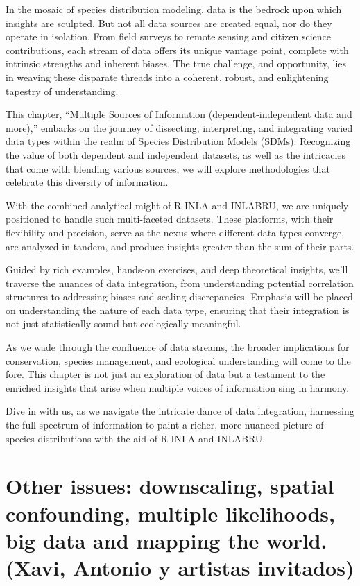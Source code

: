 \documentclass[
]{krantz}
\begin{document}
In the mosaic of species distribution modeling, data is the bedrock upon which insights are sculpted. But not all data sources are created equal, nor do they operate in isolation. From field surveys to remote sensing and citizen science contributions, each stream of data offers its unique vantage point, complete with intrinsic strengths and inherent biases. The true challenge, and opportunity, lies in weaving these disparate threads into a coherent, robust, and enlightening tapestry of understanding.

This chapter, ``Multiple Sources of Information (dependent-independent data and more),'' embarks on the journey of dissecting, interpreting, and integrating varied data types within the realm of Species Distribution Models (SDMs). Recognizing the value of both dependent and independent datasets, as well as the intricacies that come with blending various sources, we will explore methodologies that celebrate this diversity of information.

With the combined analytical might of R-INLA and INLABRU, we are uniquely positioned to handle such multi-faceted datasets. These platforms, with their flexibility and precision, serve as the nexus where different data types converge, are analyzed in tandem, and produce insights greater than the sum of their parts.

Guided by rich examples, hands-on exercises, and deep theoretical insights, we'll traverse the nuances of data integration, from understanding potential correlation structures to addressing biases and scaling discrepancies. Emphasis will be placed on understanding the nature of each data type, ensuring that their integration is not just statistically sound but ecologically meaningful.

As we wade through the confluence of data streams, the broader implications for conservation, species management, and ecological understanding will come to the fore. This chapter is not just an exploration of data but a testament to the enriched insights that arise when multiple voices of information sing in harmony.

Dive in with us, as we navigate the intricate dance of data integration, harnessing the full spectrum of information to paint a richer, more nuanced picture of species distributions with the aid of R-INLA and INLABRU.

\pagebreak
\setcounter{chapter}{14}
\setcounter{section}{0}
\renewcommand{\thepage}{\arabic{page}}

\hypertarget{other-issues-downscaling-spatial-confounding-multiple-likelihoods-big-data-and-mapping-the-world.-xavi-antonio-y-artistas-invitados}{%
\chapter{Other issues: downscaling, spatial confounding, multiple likelihoods, big data and mapping the world. (Xavi, Antonio y artistas invitados)}\label{other-issues-downscaling-spatial-confounding-multiple-likelihoods-big-data-and-mapping-the-world.-xavi-antonio-y-artistas-invitados}}
\end{document}
